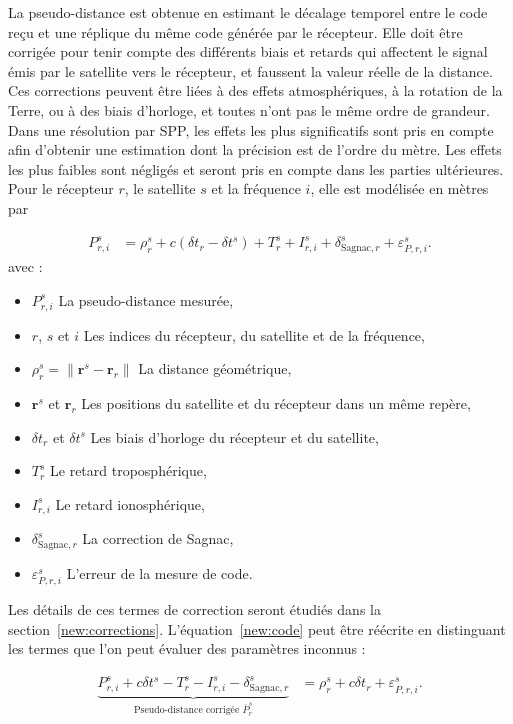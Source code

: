 La pseudo-distance est obtenue en estimant le décalage temporel entre le code
reçu et une réplique du même code générée par le récepteur. Elle doit être
corrigée pour tenir compte des différents biais et retards qui affectent le signal émis par le satellite vers le récepteur, et
faussent la valeur réelle de la distance.
Ces corrections peuvent être liées à des effets atmosphériques, à la rotation de la Terre, ou à des biais d'horloge, et toutes n'ont pas
le même ordre de grandeur. Dans une résolution par SPP, les effets les plus
significatifs sont pris en compte afin d'obtenir une estimation
dont la précision est de l'ordre du mètre. Les effets les plus faibles sont négligés et seront pris en compte dans les parties ultérieures.
Pour le récepteur
$r$, le satellite $s$ et la fréquence $i$, elle est modélisée en mètres par

\begin{align}
P_{r,i}^s &=
\rho_r^s+c(\delta t_r-\delta t^s)+T_r^s+I_{r,i}^s
+\delta_{\mathrm{Sagnac},r}^s
+\varepsilon_{P,r,i}^s.
\label{new:code}
\end{align}
avec :
\begin{itemize}
    \item $P_{r,i}^s$ La pseudo-distance mesurée,
    \item $r$, $s$ et $i$ Les indices du récepteur, du satellite et de la
    fréquence,
    \item $\rho_r^s=\|\mathbf r^s-\mathbf r_r\|$ La distance géométrique,
    \item $\mathbf r^s$ et $\mathbf r_r$ Les positions du satellite et du
    récepteur dans un même repère,
    \item $\delta t_r$ et $\delta t^s$ Les biais d'horloge du récepteur et du
    satellite,
    \item $T_r^s$ Le retard troposphérique,
    \item $I_{r,i}^s$ Le retard ionosphérique,
    \item $\delta_{\mathrm{Sagnac},r}^s$ La correction de Sagnac,
    \item $\varepsilon_{P,r,i}^s$ L'erreur de la mesure de code.
\end{itemize}

Les détails de ces termes de correction seront étudiés dans la
section~\ref{new:corrections}. L'équation~\eqref{new:code} peut être réécrite en
distinguant les termes que l'on peut évaluer des paramètres inconnus :

\begin{align}
\underbrace{
P_{r,i}^s
+c\delta t^s
-T_r^s
-I_{r,i}^s
-\delta_{\mathrm{Sagnac},r}^s
}_{\text{Pseudo-distance corrigée }\overline P_r^s}
&=
\rho_r^s+c\delta t_r+\varepsilon_{P,r,i}^s.
\label{eq:termes_eval}
\end{align}

